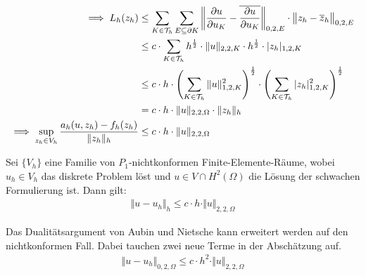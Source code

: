 \begin{align*}
\implies
L_h(z_h)
&\leq
\sum\limits_{K\in\mathcal{T}_h}\sum\limits_{E\subseteq\partial K}\left\Vert\frac{\partial u}{\partial u_K}-\overline{\frac{\partial u}{\partial u_K}}\right\Vert_{0,2,E}\cdot\big\Vert z_h-\overline{z}_h\big\Vert_{0,2,E}\\
&\leq
c\cdot\sum\limits_{K\in\mathcal{T}_h} h^{\frac{1}{2}}\cdot\Vert u\Vert_{2,2,K}\cdot h^{\frac{1}{2}}\cdot|z_h|_{1,2,K}\\
&\leq
c\cdot h\cdot\left(\sum\limits_{K\in\mathcal{T}_h}\Vert u\Vert^2_{1,2,K}\right)^{\frac{1}{2}}\cdot\left(\sum\limits_{K\in\mathcal{T}_h}|z_h|_{1,2,K}^2\right)^{\frac{1}{2}}\\
&=c\cdot h\cdot \Vert u\Vert_{2,2,\Omega}\cdot\Vert z_h\Vert_h\\
\implies
\sup\limits_{z_h\in V_h}\frac{a_h(u, z_h)-f_h(z_h)}{\Vert z_h\Vert_h}
&\leq c\cdot h\cdot\Vert u\Vert_{2,2,\Omega}
\end{align*}

\begin{theorem}\label{theorem5.2}
Sei $\lbrace V_h\rbrace$ eine Familie von $P_1$-nichtkonformen Finite-Elemente-Räume, wobei $u_h\in V_h$ das diskrete Problem löst und $u\in V\cap H^2(\Omega)$ die Lösung der schwachen Formulierung ist. Dann gilt:
\begin{align*}
\big\Vert u-u_h\big\Vert_h\leq c\cdot h\cdot\Vert u\Vert_{2,2,\Omega}
\end{align*}
\end{theorem}

\begin{bemerkung}
Das Dualitätsargument von Aubin und Nietsche kann erweitert werden auf den nichtkonformen Fall. Dabei tauchen zwei neue Terme in der Abschätzung auf.
\begin{align*}
	\big\Vert u-u_h\big\Vert_{0,2,\Omega}\leq c\cdot h^2\cdot\Vert u\Vert_{2,2,\Omega}
\end{align*}
\end{bemerkung}

